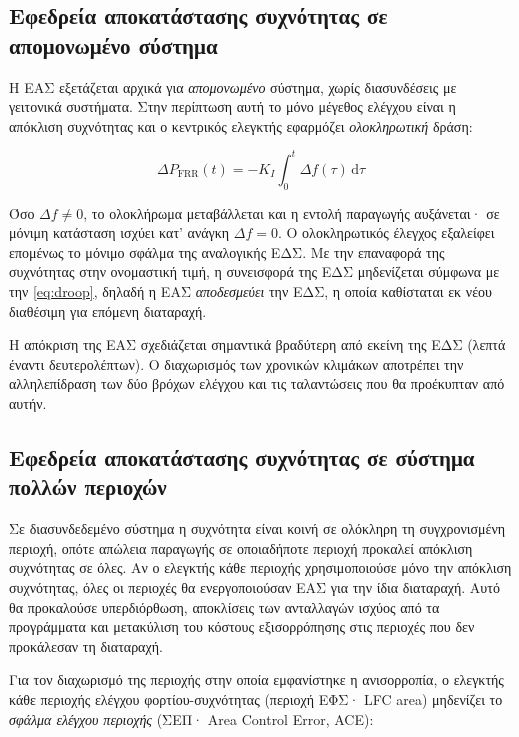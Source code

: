 \subsection{Εφεδρεία αποκατάστασης συχνότητας σε απομονωμένο σύστημα}

Η ΕΑΣ εξετάζεται αρχικά για \emph{απομονωμένο} σύστημα, χωρίς διασυνδέσεις με γειτονικά
συστήματα. Στην περίπτωση αυτή το μόνο μέγεθος ελέγχου είναι η απόκλιση συχνότητας και ο
κεντρικός ελεγκτής εφαρμόζει \emph{ολοκληρωτική} δράση:

\begin{equation}
\Delta P_{\mathrm{FRR}}(t) = -K_I \int_0^{t} \Delta f(\tau)\,\mathrm{d}\tau
\label{eq:frr-isolated}
\end{equation}

Όσο $\Delta f \neq 0$, το ολοκλήρωμα μεταβάλλεται και η εντολή παραγωγής αυξάνεται· σε μόνιμη
κατάσταση ισχύει κατ' ανάγκη $\Delta f = 0$. Ο ολοκληρωτικός έλεγχος εξαλείφει επομένως το
μόνιμο σφάλμα της αναλογικής ΕΔΣ. Με την επαναφορά της συχνότητας στην ονομαστική τιμή, η
συνεισφορά της ΕΔΣ μηδενίζεται σύμφωνα με την \eqref{eq:droop}, δηλαδή η ΕΑΣ
\emph{αποδεσμεύει} την ΕΔΣ, η οποία καθίσταται εκ νέου διαθέσιμη για επόμενη διαταραχή.

Η απόκριση της ΕΑΣ σχεδιάζεται σημαντικά βραδύτερη από εκείνη της ΕΔΣ (λεπτά έναντι
δευτερολέπτων). Ο διαχωρισμός των χρονικών κλιμάκων αποτρέπει την αλληλεπίδραση των δύο
βρόχων ελέγχου και τις ταλαντώσεις που θα προέκυπταν από αυτήν.

\subsection{Εφεδρεία αποκατάστασης συχνότητας σε σύστημα πολλών περιοχών}
\label{sec:frr-multi}

Σε διασυνδεδεμένο σύστημα η συχνότητα είναι κοινή σε ολόκληρη τη συγχρονισμένη περιοχή,
οπότε απώλεια παραγωγής σε οποιαδήποτε περιοχή προκαλεί απόκλιση συχνότητας σε όλες. Αν ο
ελεγκτής κάθε περιοχής χρησιμοποιούσε μόνο την απόκλιση συχνότητας, όλες οι περιοχές θα
ενεργοποιούσαν ΕΑΣ για την ίδια διαταραχή. Αυτό θα προκαλούσε υπερδιόρθωση, αποκλίσεις των
ανταλλαγών ισχύος από τα προγράμματα και μετακύλιση του κόστους εξισορρόπησης στις περιοχές
που δεν προκάλεσαν τη διαταραχή.

Για τον διαχωρισμό της περιοχής στην οποία εμφανίστηκε η ανισορροπία, ο ελεγκτής κάθε
περιοχής ελέγχου φορτίου-συχνότητας (περιοχή ΕΦΣ· LFC area) μηδενίζει το \emph{σφάλμα ελέγχου
περιοχής} (ΣΕΠ· Area Control Error, ACE):

